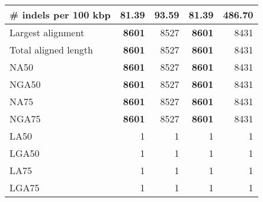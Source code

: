 \documentclass[12pt,a4paper]{article}
\begin{document}
\begin{table}[ht]
\begin{center}
\begin{tabular}{|l*{4}{|r}|}
\# indels per 100 kbp & {\bf 81.39} & 93.59 & {\bf 81.39} & 486.70 \\ \hline
Largest alignment & {\bf 8601} & 8527 & {\bf 8601} & 8431 \\ \hline
Total aligned length & {\bf 8601} & 8527 & {\bf 8601} & 8431 \\ \hline
NA50 & {\bf 8601} & 8527 & {\bf 8601} & 8431 \\ \hline
NGA50 & {\bf 8601} & 8527 & {\bf 8601} & 8431 \\ \hline
NA75 & {\bf 8601} & 8527 & {\bf 8601} & 8431 \\ \hline
NGA75 & {\bf 8601} & 8527 & {\bf 8601} & 8431 \\ \hline
LA50 & 1 & 1 & 1 & 1 \\ \hline
LGA50 & 1 & 1 & 1 & 1 \\ \hline
LA75 & 1 & 1 & 1 & 1 \\ \hline
LGA75 & 1 & 1 & 1 & 1 \\ \hline
\end{tabular}
\end{center}
\end{table}
\end{document}
